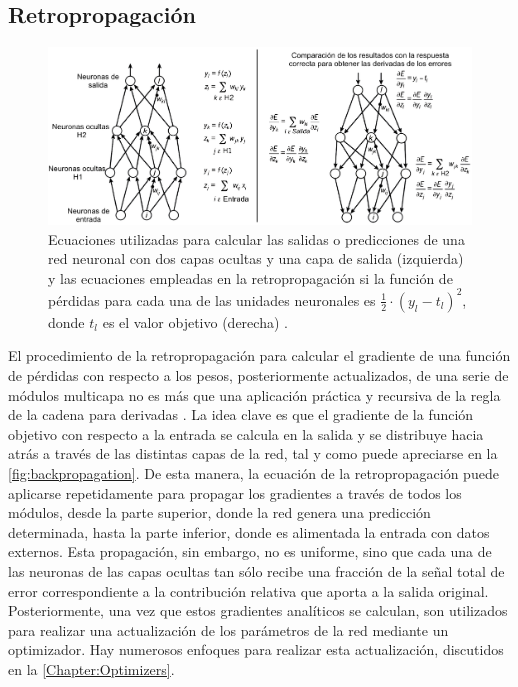 \subsection{Retropropagación} \label{Chapter:Backpropagation}

\begin{figure}
    \centering
    \includegraphics[width=\textwidth]{Images/backpropagation.png}
    \caption{Ecuaciones utilizadas para calcular las salidas o predicciones de una red neuronal con dos capas ocultas y una capa de salida (izquierda) y las ecuaciones empleadas en la retropropagación si la función de pérdidas para cada una de las unidades neuronales es $\frac{1}{2}\cdot (y_l - t_l)^2$, donde $t_l$ es el valor objetivo (derecha) \cite{DeepLearning}.}
    \label{fig:backpropagation}
\end{figure}

El procedimiento de la retropropagación para calcular el gradiente de una función de pérdidas con respecto a los pesos, posteriormente actualizados, de una serie de módulos multicapa no es más que una aplicación práctica y recursiva de la regla de la cadena para derivadas \cite{DeepLearning}. La idea clave es que el gradiente de la función objetivo con respecto a la entrada se calcula en la salida y se distribuye hacia atrás a través de las distintas capas de la red, tal y como puede apreciarse en la \autoref{fig:backpropagation}. De esta manera, la ecuación de la retropropagación puede aplicarse repetidamente para propagar los gradientes a través de todos los módulos, desde la parte superior, donde la red genera una predicción determinada, hasta la parte inferior, donde es alimentada la entrada con datos externos. Esta propagación, sin embargo, no es uniforme, sino que cada una de las neuronas de las capas ocultas tan sólo recibe una fracción de la señal total de error correspondiente a la contribución relativa que aporta a la salida original. Posteriormente, una vez que estos gradientes analíticos se calculan, son utilizados para realizar una actualización de los parámetros de la red mediante un optimizador. Hay numerosos enfoques para realizar esta actualización, discutidos en la \autoref{Chapter:Optimizers}.

